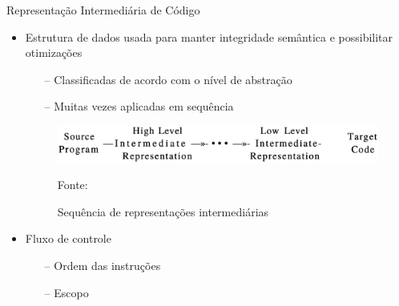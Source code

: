 \begin{frame}{Representação Intermediária de Código}
    \begin{itemize}
        \item Estrutura de dados usada para manter integridade semântica e possibilitar otimizações~\cite{cooper2014}
              \begin{itemize}
                  \item[--] Classificadas de acordo com o nível de abstração
                  \item[--] Muitas vezes aplicadas em sequência
              \end{itemize}
        \item[] \begin{figure}
                  \centering
                  \includegraphics[width=.7\textwidth]{Imagens/abstraction-level-irs.eps}
                  \caption{Sequência de representações intermediárias}\label{fig:abstraction-level-irs}
                  \small{Fonte:~\cite{aho2008compilers}}
              \end{figure}
        \item Fluxo de controle
              \begin{itemize}
                  \item[--] Ordem das instruções
                  \item[--] Escopo
              \end{itemize}
    \end{itemize}
\end{frame}
